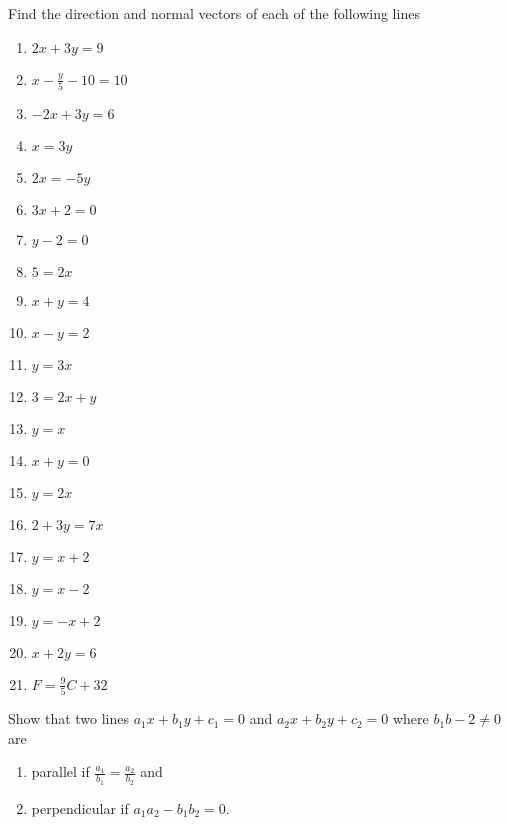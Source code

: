 Find the direction and normal vectors of each of the following lines
\begin{enumerate}[label=\thesubsection.\arabic*,ref=\thesubsection.\theenumi]
\item $2x+3y=9$
\item $x-\frac{y}{5}-10=10$
\item $-2x+3y=6$
\item $ x=3y$
\item $2x=-5y$
\item $3x+2=0$
\item $y-2=0$
\item $5=2x$
\item $x+y=4$
\item $x-y=2$
\item $y=3x$
\item $3=2x+y$
\item $y=x$
\item $x+y=0$
\item $y=2x$
\item $2+3y=7x$
\item $y=x+2$
\item $y=x-2$
\item $y=-x+2$
\item $x+2y=6$
\item $F=\frac{9}{5}C+32$
\end{enumerate}
Show that two lines $a_1x+b_1y+c_1=0$ and $a_2x+b_2y+c_2=0$ where $b_1b-2\neq 0$ are
\begin{enumerate}[label=\thesubsection.\arabic*,ref=\thesubsection.\theenumi,resume*]
\item parallel if $\frac{a_1}{b_1}=\frac{a_2}{b_2}$ and 
\item perpendicular if $a_1a_2-b_1b_2=0$.
\end{enumerate}
